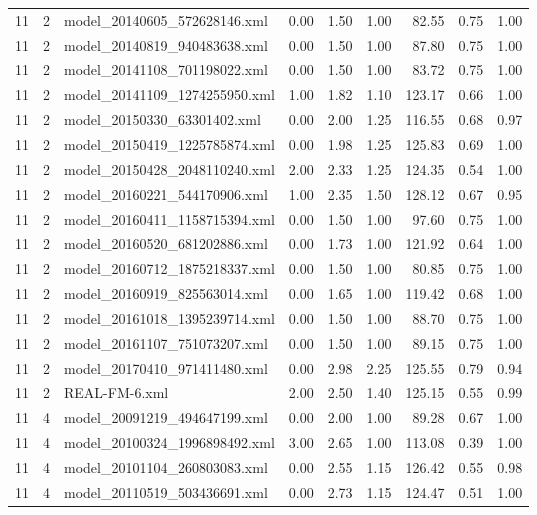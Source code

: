 \begin{table}[ht]
\begin{tabular}{rrlrrrrrr}
   11 &   2 & model\_20140605\_572628146.xml & 0.00 & 1.50 & 1.00 & 82.55 & 0.75 & 1.00 \\ 
   11 &   2 & model\_20140819\_940483638.xml & 0.00 & 1.50 & 1.00 & 87.80 & 0.75 & 1.00 \\ 
   11 &   2 & model\_20141108\_701198022.xml & 0.00 & 1.50 & 1.00 & 83.72 & 0.75 & 1.00 \\ 
   11 &   2 & model\_20141109\_1274255950.xml & 1.00 & 1.82 & 1.10 & 123.17 & 0.66 & 1.00 \\ 
   11 &   2 & model\_20150330\_63301402.xml & 0.00 & 2.00 & 1.25 & 116.55 & 0.68 & 0.97 \\ 
   11 &   2 & model\_20150419\_1225785874.xml & 0.00 & 1.98 & 1.25 & 125.83 & 0.69 & 1.00 \\ 
   11 &   2 & model\_20150428\_2048110240.xml & 2.00 & 2.33 & 1.25 & 124.35 & 0.54 & 1.00 \\ 
   11 &   2 & model\_20160221\_544170906.xml & 1.00 & 2.35 & 1.50 & 128.12 & 0.67 & 0.95 \\ 
   11 &   2 & model\_20160411\_1158715394.xml & 0.00 & 1.50 & 1.00 & 97.60 & 0.75 & 1.00 \\ 
   11 &   2 & model\_20160520\_681202886.xml & 0.00 & 1.73 & 1.00 & 121.92 & 0.64 & 1.00 \\ 
   11 &   2 & model\_20160712\_1875218337.xml & 0.00 & 1.50 & 1.00 & 80.85 & 0.75 & 1.00 \\ 
   11 &   2 & model\_20160919\_825563014.xml & 0.00 & 1.65 & 1.00 & 119.42 & 0.68 & 1.00 \\ 
   11 &   2 & model\_20161018\_1395239714.xml & 0.00 & 1.50 & 1.00 & 88.70 & 0.75 & 1.00 \\ 
   11 &   2 & model\_20161107\_751073207.xml & 0.00 & 1.50 & 1.00 & 89.15 & 0.75 & 1.00 \\ 
   11 &   2 & model\_20170410\_971411480.xml & 0.00 & 2.98 & 2.25 & 125.55 & 0.79 & 0.94 \\ 
   11 &   2 & REAL-FM-6.xml & 2.00 & 2.50 & 1.40 & 125.15 & 0.55 & 0.99 \\ 
   11 &   4 & model\_20091219\_494647199.xml & 0.00 & 2.00 & 1.00 & 89.28 & 0.67 & 1.00 \\ 
   11 &   4 & model\_20100324\_1996898492.xml & 3.00 & 2.65 & 1.00 & 113.08 & 0.39 & 1.00 \\ 
   11 &   4 & model\_20101104\_260803083.xml & 0.00 & 2.55 & 1.15 & 126.42 & 0.55 & 0.98 \\ 
   11 &   4 & model\_20110519\_503436691.xml & 0.00 & 2.73 & 1.15 & 124.47 & 0.51 & 1.00 \\ 

\end{tabular}
\end{table}
